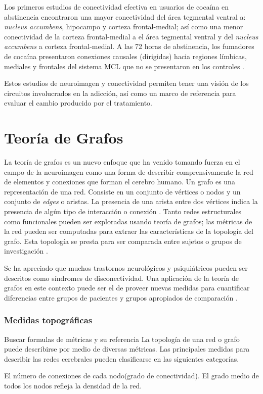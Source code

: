 Los primeros estudios de conectividad efectiva en usuarios de cocaína en abstinencia encontraron una mayor conectividad del área tegmental ventral a: \textit{nucleus accumbens}, hipocampo y corteza frontal-medial; así como una menor conectividad de la corteza frontal-medial a el área tegmental ventral y del \textit{nucleus accumbens} a corteza frontal-medial.
A las 72 horas de abstinencia, los fumadores de cocaína presentaron conexiones causales (dirigidas) hacia regiones límbicas, mediales y frontales del sistema MCL que no se presentaron en los controles \parencite{Ray2017,Ray2016}.\par
Estos estudios de neuroimagen y conectividad permiten tener una visión de los circuitos involucrados en la adicción, así como un marco de referencia para evaluar el cambio producido por el tratamiento.

\section{Teoría de Grafos}
La teoría de grafos es un nuevo enfoque que ha venido tomando fuerza en el campo de la neuroimagen como una forma de describir comprensivamente la red de elementos y conexiones que forman el cerebro humano.
Un grafo es una representación de una red. Consiste en un conjunto de vértices o nodos y un conjunto de \textit{edges} o aristas. La presencia de una arista entre dos vértices indica la presencia de algún tipo de interacción o conexión \parencite{Stam2007}.
Tanto redes estructurales como funcionales pueden ser exploradas usando teoría de grafos; las métricas de la red pueden ser computadas para extraer las características de la topología del grafo.
Esta topología se presta para ser comparada entre sujetos o grupos de investigación \parencite{Bullmore2009a,Sporns2011}.\par
Se ha apreciado que muchos trastornos neurológicos y psiquiátricos pueden ser descritos como síndromes de disconectividad.
Una aplicación de la teoría de grafos en este contexto puede ser el de proveer nuevas medidas para cuantificar diferencias entre grupos de pacientes y grupos apropiados de comparación \parencite{Bullmore2009a}.

\subsubsection{Medidas topográficas}
Buscar formulas de métricas y su referencia
La topología de una red o grafo puede describirse por medio de diversas métricas. Las principales medidas para describir las redes cerebrales pueden clasificarse en las siguientes categorías.\par
\theoremstyle{definition}
\newtheorem*{def1}{Costo}
\newtheorem*{def2}{Segregación}
\newtheorem*{def3}{Integración}
\newtheorem*{def4}{Pequeño Mundo}
El número de conexiones de cada nodo(grado de conectividad). El grado medio de todos los nodos refleja la densidad de la red.
